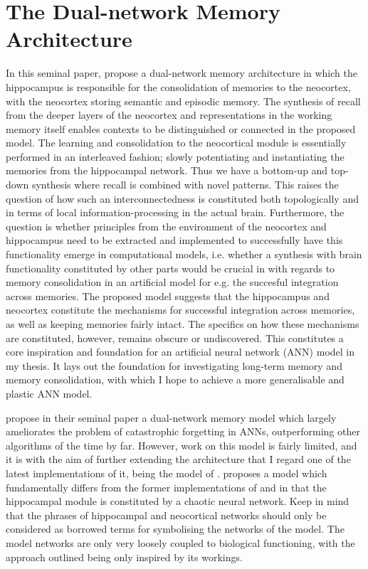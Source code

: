 \section{The Dual-network Memory Architecture}

In this seminal paper, \cite{McClelland1995} propose a dual-network memory architecture in which the hippocampus is responsible for the consolidation of memories to the neocortex, with the neocortex storing semantic and episodic memory. The synthesis of recall from the deeper layers of the neocortex and representations in the working memory itself enables contexts to be distinguished or connected in the proposed model. The learning and consolidation to the neocortical module is essentially performed in an interleaved fashion; slowly potentiating and instantiating the memories from the hippocampal network. Thus we have a bottom-up and top-down synthesis where recall is combined with novel patterns. This raises the question of how such an interconnectedness is constituted both topologically and in terms of local information-processing in the actual brain. Furthermore, the question is whether principles from the environment of the neocortex and hippocampus need to be extracted and implemented to successfully have this functionality emerge in computational models, i.e. whether a synthesis with brain functionality constituted by other parts would be crucial in with regards to memory consolidation in an artificial model for e.g. the succesful integration across memories. The proposed model suggests that the hippocampus and neocortex constitute the mechanisms for successful integration across memories, as well as keeping memories fairly intact. The specifics on how these mechanisms are constituted, however, remains obscure or undiscovered. This constitutes a core inspiration and foundation for an artificial neural network (ANN) model in my thesis. It lays out the foundation for investigating long-term memory and memory consolidation, with which I hope to achieve a more generalisable and plastic ANN model.

\cite{McClelland1995} propose in their seminal paper a dual-network memory model which largely ameliorates the problem of catastrophic forgetting in ANNs, outperforming other algorithms of the time by far. However, work on this model is fairly limited, and it is with the aim of further extending the architecture that I regard one of the latest implementations of it, being the model of \cite{Hattori2014}. \cite{Hattori2010} proposes a model which fundamentally differs from the former implementations of \cite{French1997} and \cite{Ans1997} in that the hippocampal module is constituted by a chaotic neural network. Keep in mind that the phrases of hippocampal and neocortical networks should only be considered as borrowed terms for symbolising the networks of the model. The model networks are only very loosely coupled to biological functioning, with the approach outlined being only inspired by its workings.

